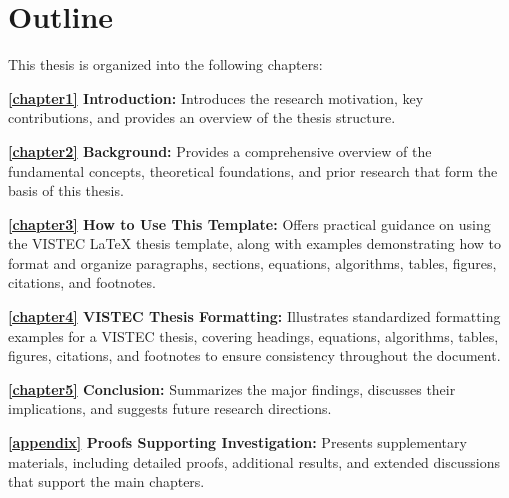 \section{Outline}
\label{ch1:sec:outline}
\begin{paragraph}
This thesis is organized into the following chapters:

\textbf{\autoref{chapter1} Introduction:}  
Introduces the research motivation, key contributions, and provides an overview of the thesis structure.

\textbf{\autoref{chapter2} Background:}  
Provides a comprehensive overview of the fundamental concepts, theoretical foundations, and prior research that form the basis of this thesis.

\textbf{\autoref{chapter3} How to Use This Template:}  
Offers practical guidance on using the VISTEC {\LaTeX} thesis template, along with examples demonstrating how to format and organize paragraphs, sections, equations, algorithms, tables, figures, citations, and footnotes.

\textbf{\autoref{chapter4} VISTEC Thesis Formatting:}  
Illustrates standardized formatting examples for a VISTEC thesis, covering headings, equations, algorithms, tables, figures, citations, and footnotes to ensure consistency throughout the document.

\textbf{\autoref{chapter5} Conclusion:}  
Summarizes the major findings, discusses their implications, and suggests future research directions.

\textbf{\autoref{appendix} Proofs Supporting Investigation:}  
Presents supplementary materials, including detailed proofs, additional results, and extended discussions that support the main chapters.
\end{paragraph}
